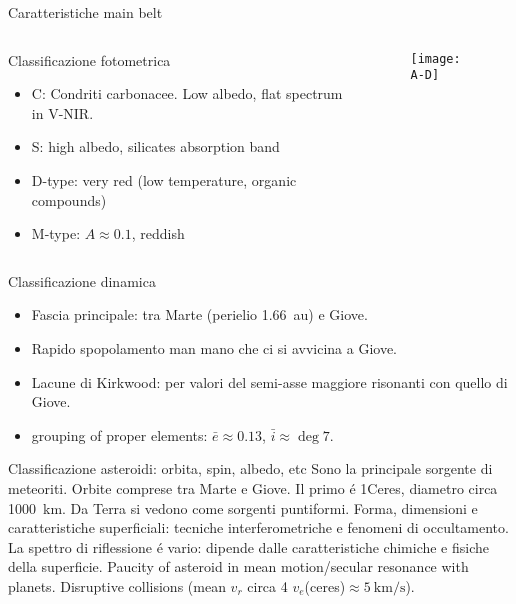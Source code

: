 \begin{frame}{Caratteristiche main belt}
\begin{columns}[T]\begin{column}{0.5\textwidth}
\begin{block}{Classificazione fotometrica}
\begin{itemize}
    \item C: Condriti carbonacee. Low albedo, flat spectrum in V-NIR.
    \item S: high albedo, silicates absorption band
    \item D-type: very red (low temperature, organic compounds)
    \item M-type: $A\approx0.1$, reddish
\end{itemize}
\end{block}
\end{column}\begin{column}{0.5\textwidth}
\begin{figure}[!ht]\texttt{[image: A-D]}\end{figure}
\end{column} \end{columns}
\begin{block}{Classificazione dinamica}
\begin{itemize}
\item Fascia principale: tra Marte (perielio \SI{1.66}{\astronomicalunit}) e Giove.
\item Rapido spopolamento man mano che ci si avvicina a Giove.
\item Lacune di Kirkwood: per valori del semi-asse maggiore risonanti con quello di Giove.
\item grouping of proper elements: $\bar{e}\approx0.13$, $\bar{i}\approx\deg{7}$.
\end{itemize}
\end{block}
\end{frame}

\begin{wordonframe}{Classificazione asteroidi: orbita, spin, albedo, etc}
Sono la principale sorgente di meteoriti.
Orbite comprese tra Marte e Giove. Il primo \'e 1Ceres, diametro circa \SI{1000}{\kilo\meter}.
Da Terra si vedono come sorgenti puntiformi. Forma, dimensioni e caratteristiche superficiali: tecniche interferometriche e fenomeni di occultamento.
La spettro di riflessione \'e vario: dipende dalle caratteristiche chimiche e fisiche della superficie.
Paucity of asteroid in mean motion/secular resonance with planets.
Disruptive collisions (mean $v_r$ circa 4 $v_e$(ceres)$\approx\SI{5}{\kilo\meter\per\second}$).
\end{wordonframe}

